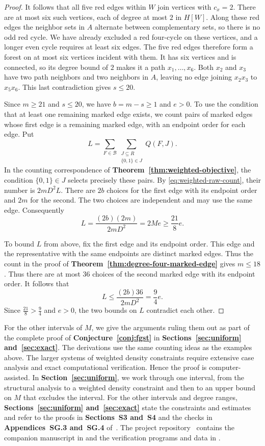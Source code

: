 \documentclass[preprint,11pt,numbers]{elsarticle-arxiv}
\numberwithin{equation}{section}
\theoremstyle{definition}
\begin{document}
\begin{proof}
It follows that all five red edges within $W$ join vertices with
$c_x=2$. There are at most six such vertices, each of degree at
most $2$ in $H[W]$. Along these red edges the neighbor sets in
$A$ alternate between complementary sets, so there is no odd
red cycle. We have already excluded a red four-cycle on these
vertices, and a longer even cycle requires at least six edges. The five
red edges therefore form a forest on at most six vertices
incident with them. It has six vertices and is connected, so
its degree bound of $2$ makes it a path $x_1,\ldots,x_6$.
Both $x_2$ and $x_3$ have two path neighbors and two neighbors
in $A$, leaving no edge joining $x_2x_3$ to $x_5x_6$.
This last contradiction gives $s\leq20$.

Since $m\geq21$ and $s\leq20$, we have $b=m-s\geq1$ and $e>0$.
To use the condition that at least one remaining marked edge
exists, we count pairs of marked edges whose first edge is a
remaining marked edge, with an endpoint order for each edge. Put
\[
 L=\sum_{F\in\mathcal B}\sum_{\substack{J\subseteq R\\ \{0,1\}\in J}}Q(F,J).
\]
In the counting correspondence of
\textbf{Theorem~\ref{thm:weighted-objective}}, the condition
$\{0,1\}\in J$ selects precisely these pairs. By
\eqref{eq:weighted-raw-count}, their number is $2mD^2L$.
There are $2b$ choices for the first edge with its
endpoint order and $2m$ for the second. The two choices are
independent and may use the same edge.
Consequently
\[
 L=\frac{(2b)(2m)}{2mD^2}=2Me\geq\frac{21}{8}e.
\]

To bound $L$ from above, fix the first edge and its endpoint order.
This edge and the representative with the same endpoints are
distinct marked edges. Thus the count in the proof of
\textbf{Theorem~\ref{thm:degree-four-marked-edge}} gives $m\leq18$.
Thus there are at most $36$ choices of the second marked edge
with its endpoint order. It follows that
\[
 L\leq\frac{(2b)36}{2mD^2}=\frac{9}{4}e.
\]
Since $\frac{21}{8}>\frac94$ and $e>0$, the two bounds on $L$
contradict each other.
\end{proof}

For the other intervals of $M$, we give the arguments ruling them out
as part of the complete proof of \textbf{Conjecture~\ref{conj:fgst}}
in \textbf{Sections~\ref{sec:uniform} and~\ref{sec:exact}}.
The derivations use the same counting ideas as the examples above.
The larger systems of weighted density constraints require extensive
case analysis and exact computational verification.
Hence the proof is computer-assisted. In
\textbf{Section~\ref{sec:uniform}}, we work through one interval,
from the structural analysis to a weighted density constraint and
then to an upper bound on $M$ that excludes the interval. For the
other intervals and degree ranges,
\textbf{Sections~\ref{sec:uniform} and~\ref{sec:exact}} state the
constraints and estimates and refer to the proofs in
\textbf{Sections~S3 and~S4} and the checks in
\textbf{Appendices~SG.3 and~SG.4} of~\cite{FGSTSupplement}.
The project repository~\cite{FGSTCode} contains the companion
manuscript in  and the verification programs and
data in .
\end{document}
